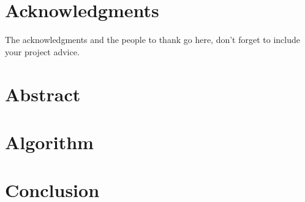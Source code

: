 \documentclass[a4paper,11pt,twoside,openright]{WCarticle}
\begin{document}

\tpage
\pagestyle{plain}

\chapter*{Acknowledgments}
The acknowledgments and the people to thank go here, don't forget to include your project advice. 


\chapter*{Abstract} 


\iffalse
\tableofcontents
\listoffigures
\listoftables
\fi
\cleardoublepage
\pagestyle{fancy}


\iffalse
\chapter{Introduction} \label{chap:intro}\pagenumbering{arabic}



\chapter{Related Work} \label{chap:backgrd}




\chapter{Preliminaries} \label{chap:prelim}\pagenumbering{arabic}

\fi

\chapter{Algorithm} \label{chap:alg}


\iffalse
\chapter{Implementation} \label{chap:impl}



\chapter{Evaluation} \label{chap:eval}


\fi
\chapter{Conclusion} \label{chap:conclusion}



\end{document}

